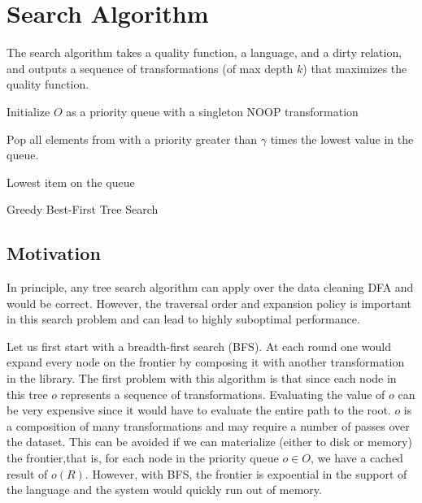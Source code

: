 \section{Search Algorithm}
The search algorithm takes a quality function, a language, and a dirty relation, and outputs a sequence of transformations (of max depth $k$) that maximizes the quality function.

\begin{algorithm}[t]

Initialize $O$ as a priority queue with a singleton NOOP transformation\\

{
    
    Pop all elements from with a priority greater than $\gamma$ times the lowest value in the queue.
}

\Return Lowest item on the queue
\caption{Greedy Best-First Tree Search}
\label{alg:main}
\end{algorithm}

\subsection{Motivation}
In principle, any tree search algorithm can apply over the data cleaning DFA and would be correct.
However, the traversal order and expansion policy is important in this search problem and can lead to highly suboptimal performance.

Let us first start with a breadth-first search (BFS). At each round one would expand every node on the frontier by composing it with another transformation in the library.
The first problem with this algorithm is that since each node in this tree $o$ represents a sequence of transformations.
Evaluating the value of $o$ can be very expensive since it would have to evaluate the entire path to the root.
$o$ is a composition of many transformations and may require a number of passes over the dataset.
This can be avoided if we can materialize (either to disk or memory) the frontier,that is, for each node in the priority queue $o \in O$, we have a cached result of $o(R)$. 
However, with BFS, the frontier is expoential in the support of the language and the system would quickly run out of memory.

